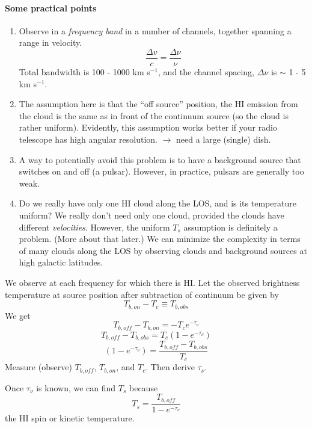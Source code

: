 \documentclass[12pt]{article}
\newcommand{\mar}[1]{\hspace{0pt}\marginpar{-\textcolor{black}{#1}-}}
\begin{document}
\paragraph{Some practical points}
\begin{enumerate}
    \item Observe in a \textit{frequency band} in a number of channels,
        together spanning a range in velocity.
        \[
            \frac{\Delta{v}}{c} = \frac{\Delta\nu}{\nu}
            \]
        Total bandwidth is 100 - 1000 km s$^{-1}$, and the channel spacing,
        $\Delta\nu$ is $\sim$ 1 - 5 km s$^{-1}$.
    \item The assumption here is that the ``off source'' position, the HI
        emission from the cloud is the same as in front of the continuum
        source (so the cloud is rather uniform). Evidently, this assumption
        works better if your radio telescope has high angular resolution.
        $\rightarrow$ need a large (single) dish.
    \item A way to potentially avoid this problem is to have a background
        source that switches on and off (a pulsar). However, in practice,
        pulsars are generally too weak.
    \item Do we really have only one HI cloud along the LOS, and is
        its temperature uniform? We really don't need only one cloud,
        provided the clouds have different \emph{velocities}.
        However, the uniform $T_{s}$ assumption is definitely a problem.
        (More about that later.) We can minimize the complexity in terms of
        many clouds along the LOS by observing clouds and background
        sources at high galactic latitudes.
\end{enumerate}

\mar{43}We observe at each frequency for which there is HI.
Let the
observed brightness temperature at source position after subtraction of
continuum be given by
\[
    T_{b, on} - T_{c} \equiv T_{b, obs}
    \]
We get
\[
    T_{b, off} - T_{b, on} = -T_{c} e^{-\tau_{\nu}}
    \]
\[
    T_{b, off} - T_{b, obs} = T_{c} \left( 1 - e^{-\tau_{\nu}} \right)
    \]
\[
    \left( 1 - e^{-\tau_{\nu}} \right) = \frac{T_{b, off} - T_{b, obs}}{T_{c}}
    \]
Measure (observe) $T_{b, off}$, $T_{b, on}$, and $T_{c}$. Then derive
$\tau_{\nu}$.

Once $\tau_{\nu}$ is known, we can find $T_{s}$ because
\[
    T_{s} = \frac{T_{b,off}}{1 - e^{-\tau_{\nu}}}
    \]
the HI spin or kinetic temperature.
\end{document}

